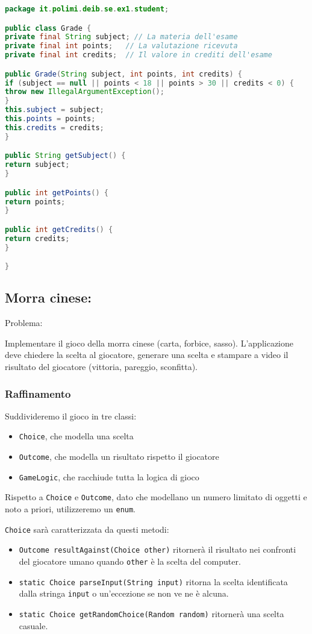 \documentclass{article}
\begin{document}
\begin{lstlisting}[language=Java,escapechar=|]
package it.polimi.deib.se.ex1.student;

public class Grade {
private final String subject; // La materia dell'esame
private final int points;	// La valutazione ricevuta
private final int credits;	// Il valore in crediti dell'esame

public Grade(String subject, int points, int credits) {
if (subject == null || points < 18 || points > 30 || credits < 0) {
throw new IllegalArgumentException();
}
this.subject = subject;
this.points = points;
this.credits = credits;
}

public String getSubject() {
return subject;
}

public int getPoints() {
return points;
}

public int getCredits() {
return credits;
}

}
\end{lstlisting}
\subsection{Morra cinese:}

Problema:

Implementare il gioco della morra cinese (carta, forbice, sasso).
L'applicazione deve chiedere la scelta al giocatore, generare una scelta e stampare a video il risultato del 
giocatore (vittoria, pareggio, sconfitta).

\subsubsection{Raffinamento}

Suddivideremo il gioco in tre classi: 
\begin{itemize}
	\item \texttt{Choice}, che modella una scelta
	\item \texttt{Outcome}, che modella un risultato rispetto il giocatore
	\item \texttt{GameLogic}, che racchiude tutta la logica di gioco
\end{itemize}

Rispetto a \texttt{Choice} e \texttt{Outcome}, dato che modellano un numero limitato di oggetti e noto a priori,
utilizzeremo un \texttt{enum}.

\texttt{Choice} sarà caratterizzata da questi metodi:
\begin{itemize}
	\item \texttt{Outcome resultAgainst(Choice other)} ritornerà il risultato nei confronti del giocatore umano quando \texttt{other} è la scelta del computer.
	\item \texttt{static Choice parseInput(String input)} ritorna la scelta identificata dalla stringa \texttt{input} o un'eccezione
	se non ve ne è alcuna.
	\item \texttt{static Choice getRandomChoice(Random random)} ritornerà una scelta casuale.
\end{itemize}
\end{document}
